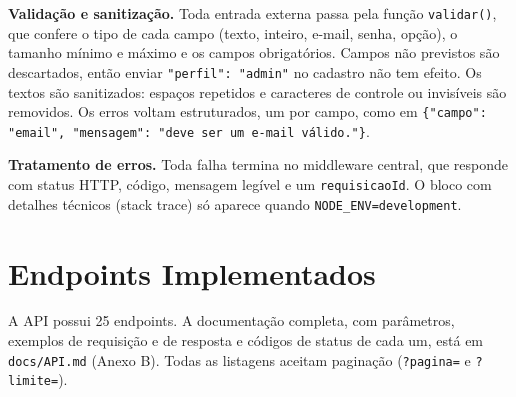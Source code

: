 \documentclass[12pt,a4paper]{article}
\newcommand{\cod}[1]{\texttt{#1}}
\begin{document}
\textbf{Validação e sanitização.} Toda entrada externa passa pela função
\cod{validar()}, que confere o tipo de cada campo (texto, inteiro, e-mail, senha,
opção), o tamanho mínimo e máximo e os campos obrigatórios. Campos não previstos
são descartados, então enviar \cod{"perfil": "admin"} no cadastro não tem efeito.
Os textos são sanitizados: espaços repetidos e caracteres de controle ou
invisíveis são removidos. Os erros voltam estruturados, um por campo, como em
\cod{\{"campo": "email", "mensagem": "deve ser um e-mail válido."\}}.

\textbf{Tratamento de erros.} Toda falha termina no middleware central, que
responde com status HTTP, código, mensagem legível e um \cod{requisicaoId}. O
bloco com detalhes técnicos (stack trace) só aparece quando
\cod{NODE\_ENV=development}.

\section{Endpoints Implementados}

A API possui 25 endpoints. A documentação completa, com parâmetros, exemplos de
requisição e de resposta e códigos de status de cada um, está em
\cod{docs/API.md} (Anexo B). Todas as listagens aceitam paginação
(\cod{?pagina=} e \cod{?limite=}).
\end{document}
